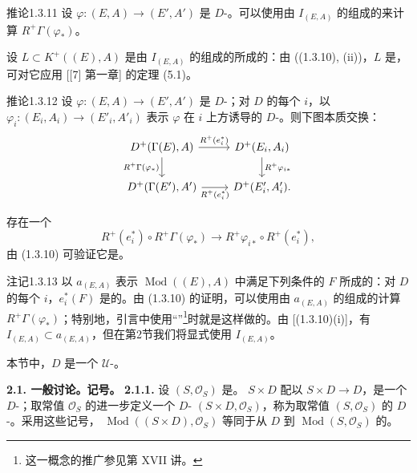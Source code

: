 \begin{SGAresult}{推论}{1.3.11}
设 $\varphi:(E,A)\to(E',A')$ 是 $D$-。可以使用由 $I_{(E,A)}$ 的组成的来计算 $R^+\Gamma(\varphi_*)$。
\end{SGAresult}
设 $L\subset K^+((E),A)$ 是由 $I_{(E,A)}$ 的组成的所成的：由 ((1.3.10), (ii))，$L$ 是，可对它应用 [[7] 第一章] 的定理 (5.1)。

\begin{SGAresult}{推论}{1.3.12}
设 $\varphi:(E,A)\to(E',A')$ 是 $D$-；对 $D$ 的每个 $i$，以 $\varphi_i:(E_i,A_i)\to(E'_i,A'_i)$ 表示 $\varphi$ 在 $i$ 上方诱导的 $D$-。则下图本质交换：
\[
\begin{tikzcd}
D^+(\Gamma(E),A) \arrow[r,"R^+(e_i^*)"] \arrow[d,"R^+\Gamma(\varphi_*)"'] & D^+(E_i,A_i) \arrow[d,"R^+\varphi_{i*}"]\\
D^+(\Gamma(E'),A') \arrow[r,"R^+(e_i^*)"'] & D^+(E'_i,A'_i).
\end{tikzcd}
\]
\end{SGAresult}
存在一个
\[
R^+(e_i^*)\circ R^+\Gamma(\varphi_*)\longrightarrow R^+\varphi_{i*}\circ R^+(e_i^*),
\]
由 (1.3.10) 可验证它是。

\begin{SGAresult}{注记}{1.3.13}
以 $a_{(E,A)}$ 表示 $\operatorname{Mod}((E),A)$ 中满足下列条件的 $F$ 所成的：对 $D$ 的每个 $i$，$e_i^*(F)$ 是的。由 (1.3.10) 的证明，可以使用由 $a_{(E,A)}$ 的组成的计算 $R^+\Gamma(\varphi_*)$；特别地，引言中使用“”\footnote{这一概念的推广参见第 XVII 讲。}时就是这样做的。由 [(1.3.10)(i)]，有 $I_{(E,A)}\subset a_{(E,A)}$，但在第2节我们将显式使用 $I_{(E,A)}$。
\end{SGAresult}

本节中，$D$ 是一个 $\mathcal U$-。

\textbf{2.1. 一般讨论。记号。}
\textbf{2.1.1.} 设 $(S,\mathcal O_S)$ 是。 $S\times D$ 配以 $S\times D\to D$，是一个 $D$-；取常值 $\mathcal O_S$ 的进一步定义一个 $D$- $(S\times D,\mathcal O_S)$，称为取常值 $(S,\mathcal O_S)$ 的 $D$-。采用这些记号， $\operatorname{Mod}((S\times D),\mathcal O_S)$ 等同于从 $D$ 到 $\operatorname{Mod}(S,\mathcal O_S)$ 的。

